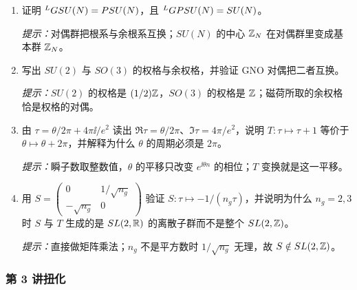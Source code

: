 \begin{enumerate}[label=\arabic*.,start=5,leftmargin=2.4em,itemsep=6pt]
\item 证明 ${}^{L}G{SU(N)}=PSU(N)$，且 ${}^{L}G{PSU(N)}=SU(N)$。
\par\smallskip\noindent\emph{提示：}对偶群把根系与余根系互换；$SU(N)$ 的中心 $\mathbb{Z}_N$ 在对偶群里变成基本群 $\mathbb{Z}_N$。

\item 写出 $SU(2)$ 与 $SO(3)$ 的权格与余权格，并验证 GNO 对偶把二者互换。
\par\smallskip\noindent\emph{提示：}$SU(2)$ 的权格是 $(1/2)\mathbb{Z}$，$SO(3)$ 的权格是 $\mathbb{Z}$；磁荷所取的余权格恰是权格的对偶。

\item 由 $\tau=\theta/2\pi+4\pi\ii/e^2$ 读出 $\Re\tau=\theta/2\pi$、$\Im\tau=4\pi/e^2$，说明 $T:\tau\mapsto\tau+1$ 等价于 $\theta\mapsto\theta+2\pi$，并解释为什么 $\theta$ 的周期必须是 $2\pi$。
\par\smallskip\noindent\emph{提示：}瞬子数取整数值，$\theta$ 的平移只改变 $e^{\ii\theta n}$ 的相位；$T$ 变换就是这一平移。

\item 用 $S=\begin{pmatrix}0&1/\sqrt{n_g}\\-\sqrt{n_g}&0\end{pmatrix}$ 验证 $S:\tau\mapsto-1/(n_g\tau)$，并说明为什么 $n_g=2,3$ 时 $S$ 与 $T$ 生成的是 $SL(2,\mathbb{R})$ 的离散子群而不是整个 $SL(2,\mathbb{Z})$。
\par\smallskip\noindent\emph{提示：}直接做矩阵乘法；$n_g$ 不是平方数时 $1/\sqrt{n_g}$ 无理，故 $S\notin SL(2,\mathbb{Z})$。
\end{enumerate}

\subsubsection*{第 3 讲\quad 扭化}


